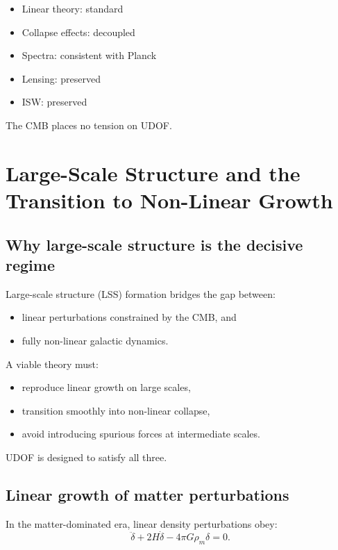 \documentclass[11pt]{book}
\begin{document}
\begin{itemize}
\item Linear theory: standard
\item Collapse effects: decoupled
\item Spectra: consistent with Planck
\item Lensing: preserved
\item ISW: preserved
\end{itemize}

The CMB places no tension on UDOF.

\chapter{Large-Scale Structure and the Transition to Non-Linear Growth}

\section{Why large-scale structure is the decisive regime}

Large-scale structure (LSS) formation bridges the gap between:
\begin{itemize}
\item linear perturbations constrained by the CMB, and
\item fully non-linear galactic dynamics.
\end{itemize}

A viable theory must:
\begin{itemize}
\item reproduce linear growth on large scales,
\item transition smoothly into non-linear collapse,
\item avoid introducing spurious forces at intermediate scales.
\end{itemize}

UDOF is designed to satisfy all three.

\section{Linear growth of matter perturbations}

In the matter-dominated era, linear density perturbations obey:
\begin{equation}
\ddot{\delta} + 2H\dot{\delta} - 4\pi G\rho_m \delta = 0.
\end{equation}
\end{document}
